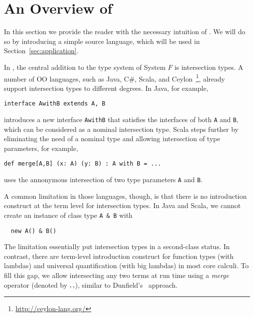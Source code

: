 \section{An Overview of \name}


In this section we provide the reader with the necessary intuition of \name. We
will do so by introducing a simple source language, which will be used in
Section~\ref{sec:application}. 

In \name, the central addition to the type system of System $ F $ is
intersection types. A number of OO languages, such as Java, C\#, Scala, and
Ceylon~\footnote{\url{http://ceylon-lang.org/}}, already support intersection
types to different degrees. In Java, for example,
\begin{lstlisting}
interface AwithB extends A, B 
\end{lstlisting}
introduces a new interface \lstinline{AwithB} that satisfies the interfaces of
both \lstinline{A} and \lstinline{B}, which can be considered as a nominal
intersection type. Scala steps further by eliminating the need of a nominal type
and allowing intersection of type parameters, for example,
\begin{lstlisting}
def merge[A,B] (x: A) (y: B) : A with B = ...
\end{lstlisting}
uses the annonymous intersection of two type parameters \lstinline{A} and
\lstinline{B}.

A common limitation in those languages, though, is that there is no introduction
construct at the term level for intersection types. In Java and Scala, we cannot
create an instance of class type \lstinline{A & B} with
\begin{lstlisting}
  new A() & B()
\end{lstlisting}

The limitation essentially put intersection types in a second-class status. In
contrast, there are term-level introduction construct for function types (with
lambdas) and universal quantification (with big lambdas) in most core calculi.
To fill this gap, we allow intersecting any two terms at run time using a
\emph{merge} operator (denoted by $ ,, $), similar to
Dunfield's~\cite{dunfield2014elaborating} approach.


